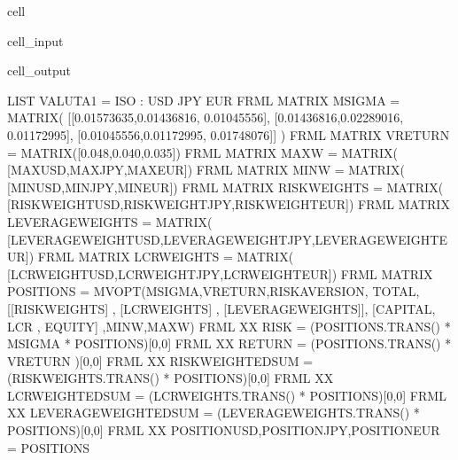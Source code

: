 \documentclass[letterpaper,10pt,english]{jupyterBook}
\begin{document}
\begin{sphinxuseclass}{cell}\begin{sphinxVerbatimInput}

\begin{sphinxuseclass}{cell_input}
\begin{sphinxVerbatim}[commandchars=\\\{\}]
\end{sphinxVerbatim}

\end{sphinxuseclass}\end{sphinxVerbatimInput}
\begin{sphinxVerbatimOutput}

\begin{sphinxuseclass}{cell_output}
\begin{sphinxVerbatim}[commandchars=\\\{\}]
LIST VALUTA1 = ISO  : USD JPY EUR \PYGZdl{}
FRML \PYGZlt{}MATRIX\PYGZgt{} MSIGMA  = MATRIX( [[0.01573635,0.01436816,	0.01045556],
                                 [0.01436816,0.02289016,	0.01172995],
                                 [0.01045556,0.01172995,	0.01748076]]  ) \PYGZdl{}
FRML \PYGZlt{}MATRIX\PYGZgt{} VRETURN         = MATRIX([0.048,0.040,0.035]) \PYGZdl{}
FRML \PYGZlt{}MATRIX\PYGZgt{} MAX\PYGZus{}W             = MATRIX(
[MAX\PYGZus{}USD,MAX\PYGZus{}JPY,MAX\PYGZus{}EUR])      \PYGZdl{}
FRML \PYGZlt{}MATRIX\PYGZgt{} MIN\PYGZus{}W             = MATRIX(
[MIN\PYGZus{}USD,MIN\PYGZus{}JPY,MIN\PYGZus{}EUR])       \PYGZdl{}
FRML \PYGZlt{}MATRIX\PYGZgt{} RISK\PYGZus{}WEIGHTS      = MATRIX(
[RISK\PYGZus{}WEIGHT\PYGZus{}USD,RISK\PYGZus{}WEIGHT\PYGZus{}JPY,RISK\PYGZus{}WEIGHT\PYGZus{}EUR]) \PYGZdl{}
FRML \PYGZlt{}MATRIX\PYGZgt{} LEVERAGE\PYGZus{}WEIGHTS  = MATRIX(
[LEVERAGE\PYGZus{}WEIGHT\PYGZus{}USD,LEVERAGE\PYGZus{}WEIGHT\PYGZus{}JPY,LEVERAGE\PYGZus{}WEIGHT\PYGZus{}EUR]) \PYGZdl{}
FRML \PYGZlt{}MATRIX\PYGZgt{} LCR\PYGZus{}WEIGHTS       = MATRIX(
[LCR\PYGZus{}WEIGHT\PYGZus{}USD,LCR\PYGZus{}WEIGHT\PYGZus{}JPY,LCR\PYGZus{}WEIGHT\PYGZus{}EUR]) \PYGZdl{}
FRML \PYGZlt{}MATRIX\PYGZgt{} POSITIONS          =  MV\PYGZus{}OPT(MSIGMA,VRETURN,RISKAVERSION, TOTAL,
                      [[RISK\PYGZus{}WEIGHTS] , [\PYGZhy{}LCR\PYGZus{}WEIGHTS] , [LEVERAGE\PYGZus{}WEIGHTS]],
                                       [CAPITAL, \PYGZhy{}LCR , EQUITY] ,MIN\PYGZus{}W,MAX\PYGZus{}W) \PYGZdl{}
FRML XX      RISK               =  (POSITIONS.TRANS() * MSIGMA * POSITIONS)[0,0]\PYGZdl{}
FRML XX      RETURN             =  (POSITIONS.TRANS() * VRETURN        )[0,0] \PYGZdl{}
FRML XX      RISK\PYGZus{}WEIGHTED\PYGZus{}SUM     = (RISK\PYGZus{}WEIGHTS.TRANS() * POSITIONS)[0,0] \PYGZdl{}
FRML XX      LCR\PYGZus{}WEIGHTED\PYGZus{}SUM      = (LCR\PYGZus{}WEIGHTS.TRANS() * POSITIONS)[0,0] \PYGZdl{}
FRML XX      LEVERAGE\PYGZus{}WEIGHTED\PYGZus{}SUM = (LEVERAGE\PYGZus{}WEIGHTS.TRANS() * POSITIONS)[0,0] \PYGZdl{}
FRML XX      POSITION\PYGZus{}USD,POSITION\PYGZus{}JPY,POSITION\PYGZus{}EUR = POSITIONS \PYGZdl{}
\end{sphinxVerbatim}


\end{sphinxuseclass}
\end{sphinxVerbatimOutput}
\end{sphinxuseclass}
\end{document}
